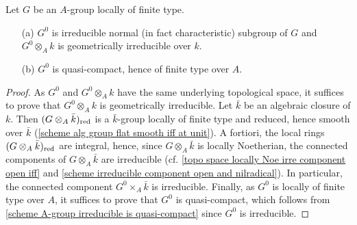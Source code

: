 \begin{proposition}\label{scheme alg group identity component prop}
Let $G$ be an $A$-group locally of finite type.
\begin{enumerate}
    \item[(a)] $G^0$ is irreducible normal (in fact characteristic) subgroup of $G$ and $G^0\otimes_Ak$ is geometrically irreducible over $k$.
    \item[(b)] $G^0$ is quasi-compact, hence of finite type over $A$.
\end{enumerate}
\end{proposition}
\begin{proof}
As $G^0$ and $G^0\otimes_Ak$ have the same underlying topological space, it suffices to prove that $G^0\otimes_Ak$ is geometrically irreducible. Let $\bar{k}$ be an algebraic closure of $k$. Then $(G\otimes_A\bar{k})_{\mathrm{red}}$ is a $\bar{k}$-group locally of finite type and reduced, hence smooth over $\bar{k}$ (\cref{scheme alg group flat smooth iff at unit}). A fortiori, the local rings $(G\otimes_A\bar{k})_{\mathrm{red}}$ are integral, hence, since $G\otimes_A\bar{k}$ is locally Noetherian, the connected components of $G\otimes_A\bar{k}$ are irreducible (cf. \cref{topo space locally Noe irre component open iff} and \cref{scheme irreducible component open and nilradical}). In particular, the connected component $G^0\times_A\bar{k}$ is irreducible. Finally, as $G^0$ is locally of finite type over $A$, it suffices to prove that $G^0$ is quasi-compact, which follows from \cref{scheme A-group irreducible is quasi-compact} since $G^0$ is irreducible.
\end{proof}


